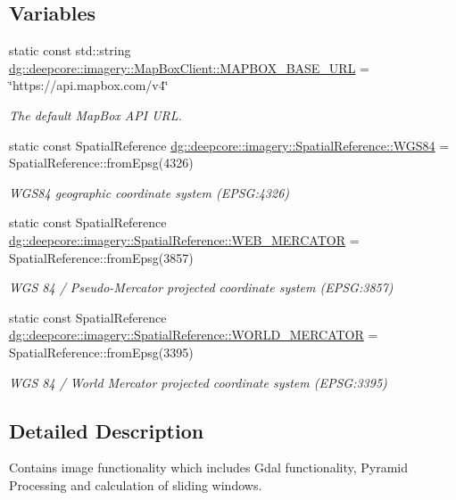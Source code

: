 \subsection*{Variables}
\begin{DoxyCompactItemize}
\item 
static const std\+::string \hyperlink{group___imagery_module_gae7617429b79fb76140ac754cbe1a52d5}{dg\+::deepcore\+::imagery\+::\+Map\+Box\+Client\+::\+M\+A\+P\+B\+O\+X\+\_\+\+B\+A\+S\+E\+\_\+\+U\+RL} = \char`\"{}https\+://api.\+mapbox.\+com/v4\char`\"{}
\begin{DoxyCompactList}\small\item\em The default Map\+Box A\+PI U\+RL. \end{DoxyCompactList}\item 
static const Spatial\+Reference \hyperlink{group___imagery_module_gaf868e08b25599956326615463649b0fa}{dg\+::deepcore\+::imagery\+::\+Spatial\+Reference\+::\+W\+G\+S84} = Spatial\+Reference\+::from\+Epsg(4326)
\begin{DoxyCompactList}\small\item\em W\+G\+S84 geographic coordinate system (E\+P\+SG\+:4326) \end{DoxyCompactList}\item 
static const Spatial\+Reference \hyperlink{group___imagery_module_ga66b2040219d82bc89193cc0a0bba177a}{dg\+::deepcore\+::imagery\+::\+Spatial\+Reference\+::\+W\+E\+B\+\_\+\+M\+E\+R\+C\+A\+T\+OR} = Spatial\+Reference\+::from\+Epsg(3857)
\begin{DoxyCompactList}\small\item\em W\+GS 84 / Pseudo-\/\+Mercator projected coordinate system (E\+P\+SG\+:3857) \end{DoxyCompactList}\item 
static const Spatial\+Reference \hyperlink{group___imagery_module_gaed40593efc83af9c4cebe9510256401b}{dg\+::deepcore\+::imagery\+::\+Spatial\+Reference\+::\+W\+O\+R\+L\+D\+\_\+\+M\+E\+R\+C\+A\+T\+OR} = Spatial\+Reference\+::from\+Epsg(3395)
\begin{DoxyCompactList}\small\item\em W\+GS 84 / World Mercator projected coordinate system (E\+P\+SG\+:3395) \end{DoxyCompactList}\end{DoxyCompactItemize}


\subsection{Detailed Description}
Contains image functionality which includes Gdal functionality, Pyramid Processing and calculation of sliding windows. 




